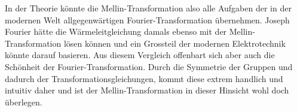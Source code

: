 In der Theorie könnte die Mellin-Transformation also alle Aufgaben der 
in der modernen Welt allgegenwärtigen Fourier-Transformation übernehmen. 
Joseph Fourier hätte die Wärmeleitgleichung damals ebenso mit der 
Mellin-Transformation lösen können und ein Grossteil der modernen 
Elektrotechnik könnte darauf basieren. 
Aus diesem Vergleich offenbart sich aber auch die Schönheit der 
Fourier-Transformation. 
Durch die Symmetrie der Gruppen und dadurch der Transformationsgleichungen,
kommt diese extrem handlich und intuitiv daher und ist der 
Mellin-Transformation in dieser Hinsicht wohl doch überlegen.



